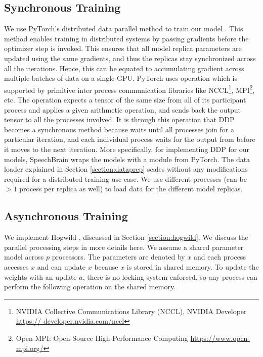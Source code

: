 \subsection{Synchronous Training}
We use PyTorch's distributed data parallel method to train our model \cite{Li2020PyTorchTraining}. This method enables training in distributed systems by passing gradients before the optimizer step is invoked. This ensures that all model replica parameters are updated using the same gradients, and thus the replicas stay synchronized across all the iterations. Hence, this can be equated to accumulating gradient across multiple batches of data on a single GPU. PyTorch uses  operation which is supported by primitive inter process communication libraries like NCCL\footnote{NVIDIA Collective Communications Library (NCCL), NVIDIA Developer \href{https://developer.nvidia.com/nccl}{https:// developer.nvidia.com/nccl}}, MPI\footnote{Open MPI: Open-Source High-Performance Computing \href{https://www.open-mpi.org/}{https://www.open-mpi.org/}}, etc. The  operation expects a tensor of the same size from all of its participant process and applies a given arithmetic operation, and sends back the output tensor to all the processes involved. It is through this operation that DDP becomes a synchronous method because   waits until all processes join for a particular iteration, and each individual process waits for the output from  before it moves to the next iteration. More specifically, for implementing DDP for our models, SpeechBrain wraps the models with a  module from PyTorch. The data loader explained in Section \ref{section:dataprep} scales without any modifications required for a distributed training use-case. We use different processes (can be $>1$ process per replica as well) to load data for the different model replicas.

\subsection{Asynchronous Training}
We implement Hogwild \cite{Niu2011HOGWILD:Descent}, discussed in Section \ref{section:hogwild}. We discuss the parallel processing steps in more details here. We assume a shared parameter model across $p$ processors. The parameters are denoted by $x$ and each process accesses $x$ and can update $x$ because $x$ is stored in shared memory. To update the weights with an update $a$, there is no locking system enforced, so any process can perform the following operation on the shared memory.


